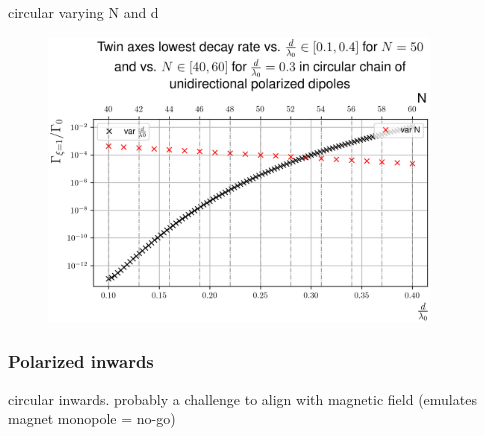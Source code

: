 \documentclass{article}
\begin{document}
circular varying N and d

\begin{figure}[H]
    \centering
    \includegraphics[width=0.9\textwidth]{figs/case_circular_unidirectional_var_distance_01_04_var_N_40_60_lowest.png}
    \caption{}
    \label{fig:circular_unidirectional_varying}
\end{figure}

\subsubsection{Polarized inwards}

circular inwards. probably a challenge to align with magnetic field (emulates magnet monopole = no-go)
\end{document}
